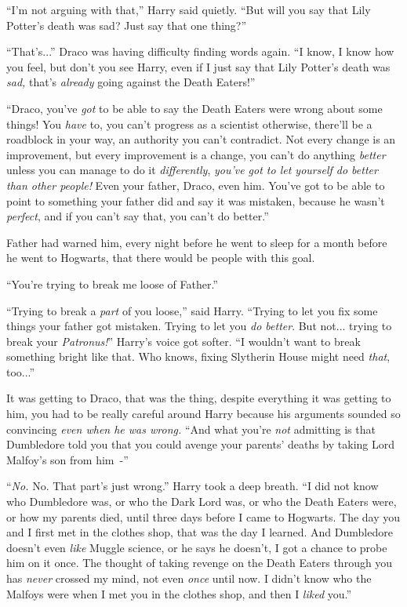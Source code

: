 ``I'm not arguing with that,'' Harry said quietly. ``But will you say that Lily Potter's death was sad? Just say that one thing?''

``That's...'' Draco was having difficulty finding words again. ``I know, I know how you feel, but don't you see Harry, even if I just say that Lily Potter's death was \emph{sad,} that's \emph{already} going against the Death Eaters!''

``Draco, you've \emph{got} to be able to say the Death Eaters were wrong about some things! You \emph{have} to, you can't progress as a scientist otherwise, there'll be a roadblock in your way, an authority you can't contradict. Not every change is an improvement, but every improvement is a change, you can't do anything \emph{better} unless you can manage to do it \emph{differently}, \emph{you've got to let yourself do better than other people!} Even your father, Draco, even him. You've got to be able to point to something your father did and say it was mistaken, because he wasn't \emph{perfect}, and if you can't say that, you can't do better.''

Father had warned him, every night before he went to sleep for a month before he went to Hogwarts, that there would be people with this goal.

``You're trying to break me loose of Father.''

``Trying to break a \emph{part} of you loose,'' said Harry. ``Trying to let you fix some things your father got mistaken. Trying to let you \emph{do better}. But not... trying to break your \emph{Patronus!}'' Harry's voice got softer. ``I wouldn't want to break something bright like that. Who knows, fixing Slytherin House might need \emph{that}, too...''

It was getting to Draco, that was the thing, despite everything it was getting to him, you had to be really careful around Harry because his arguments sounded so convincing \emph{even when he was wrong.} ``And what you're \emph{not} admitting is that Dumbledore told you that you could avenge your parents' deaths by taking Lord Malfoy's son from him~-''

``\emph{No.} No. That part's just wrong.'' Harry took a deep breath. ``I did not know who Dumbledore was, or who the Dark Lord was, or who the Death Eaters were, or how my parents died, until three days before I came to Hogwarts. The day you and I first met in the clothes shop, that was the day I learned. And Dumbledore doesn't even \emph{like} Muggle science, or he says he doesn't, I got a chance to probe him on it once. The thought of taking revenge on the Death Eaters through you has \emph{never} crossed my mind, not even \emph{once} until now. I didn't know who the Malfoys were when I met you in the clothes shop, and then I \emph{liked} you.''

